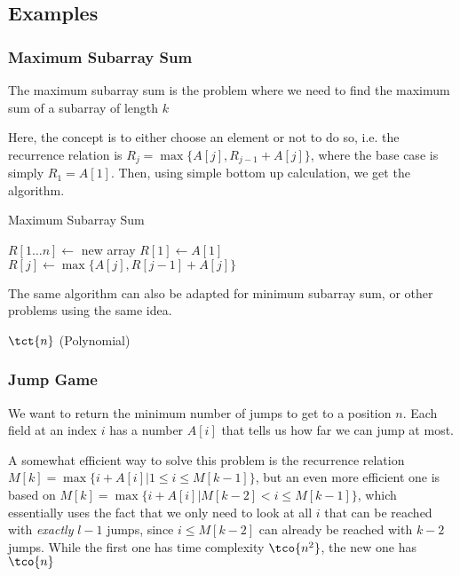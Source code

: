 \subsection{Examples}
\subsubsection{Maximum Subarray Sum}
The maximum subarray sum is the problem where we need to find the maximum sum of a subarray of length $k$

Here, the concept is to either choose an element or not to do so, i.e. the recurrence relation is $R_j = \max \{A[j], R_{j - 1} + A[j]\}$, where the base case is simply $R_1 = A[1]$. Then, using simple bottom up calculation, we get the algorithm.

\begin{algorithm}
    \begin{spacing}{1.2}
        \caption{Maximum Subarray Sum}
        \begin{algorithmic}[1]
            \State $R[1\ldots n] \gets$ new array
            \State $R[1] \gets A[1]$
                \State $R[j] \gets \max\{A[j], R[j - 1] + A[j]\}$
            \EndFor
        \end{algorithmic}
    \end{spacing}
\end{algorithm}

The same algorithm can also be adapted for minimum subarray sum, or other problems using the same idea.

\timecomplexity $\tct{n}$ (Polynomial)


\subsubsection{Jump Game}
We want to return the minimum number of jumps to get to a position $n$. Each field at an index $i$ has a number $A[i]$ that tells us how far we can jump at most. 

A somewhat efficient way to solve this problem is the recurrence relation $M[k] = \max\{i + A[i] | 1 \leq i \leq M[k - 1]\}$, but an even more efficient one is based on $M[k] = \max \{i + A[i] | M[k - 2] < i \leq M[k - 1]\}$, which essentially uses the fact that we only need to look at all $i$ that can be reached with \textit{exactly} $l - 1$ jumps, since $i \leq M[k - 2]$ can already be reached with $k - 2$ jumps. While the first one has time complexity $\tco{n^2}$, the new one has $\tco{n}$


